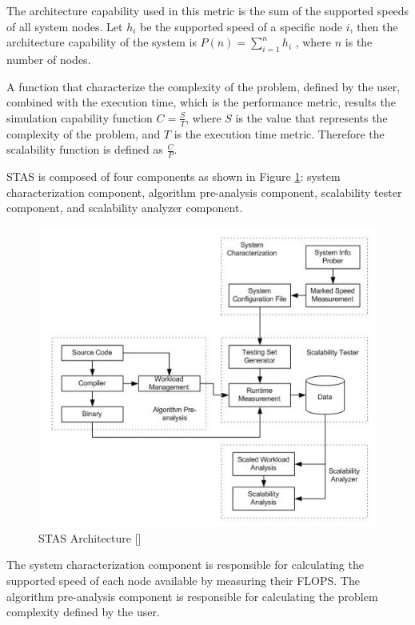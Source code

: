 The architecture capability used in this metric is the sum of the supported speeds of all system nodes. Let $h_{i}$ be the supported speed of a specific node $i$, then the architecture capability of the system is $P(n) = \sum_{i=1}^{n} h_i$ , where $n$ is the number of nodes. 

A function that characterize the complexity of the problem, defined by the user, combined with the execution time, which is the performance metric, results the simulation capability function $C = \frac{S}{T}$, where $S$ is the value that represents the complexity of the problem, and $T$ is the execution time metric. Therefore the scalability function is defined as $\frac{C}{P}$.

STAS is composed of four components as shown in Figure \ref{stasarchitecture}: system characterization component, algorithm pre-analysis component, scalability tester component, and scalability analyzer component.

\begin{figure}[htbp]
\begin{center}
	\includegraphics[scale=0.6]{images/stasarchitecture}
\caption{STAS Architecture [\cite{STAS}]}
\label{stasarchitecture}
\end{center}
\end{figure}

The system characterization component is responsible for calculating the supported speed of each node available by measuring their FLOPS. The algorithm pre-analysis component is responsible for calculating the problem complexity defined by the user. 

